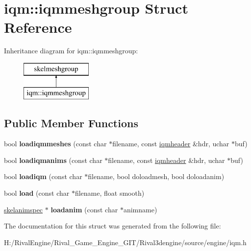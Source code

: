 \hypertarget{structiqm_1_1iqmmeshgroup}{}\section{iqm\+:\+:iqmmeshgroup Struct Reference}
\label{structiqm_1_1iqmmeshgroup}
Inheritance diagram for iqm\+:\+:iqmmeshgroup\+:\begin{figure}[H]
\begin{center}
\leavevmode
\includegraphics[height=2.000000cm]{structiqm_1_1iqmmeshgroup}
\end{center}
\end{figure}
\subsection*{Public Member Functions}
\begin{DoxyCompactItemize}
\item 
\mbox{\label{structiqm_1_1iqmmeshgroup_a4375ead72ec9379faa531c8a31ec9b30}} 
bool {\bfseries loadiqmmeshes} (const char $\ast$filename, const \hyperlink{structiqmheader}{iqmheader} \&hdr, uchar $\ast$buf)
\item 
\mbox{\label{structiqm_1_1iqmmeshgroup_abcece4550a6d63db718c3cef38a8c5cf}} 
bool {\bfseries loadiqmanims} (const char $\ast$filename, const \hyperlink{structiqmheader}{iqmheader} \&hdr, uchar $\ast$buf)
\item 
\mbox{\label{structiqm_1_1iqmmeshgroup_ae55635395d8c24abcecfbbaf6d457195}} 
bool {\bfseries loadiqm} (const char $\ast$filename, bool doloadmesh, bool doloadanim)
\item 
\mbox{\label{structiqm_1_1iqmmeshgroup_a6d954879b433a26a1fe2a5200392b0c8}} 
bool {\bfseries load} (const char $\ast$filename, float smooth)
\item 
\mbox{\label{structiqm_1_1iqmmeshgroup_a165d0faadc64faeb6d41889685698222}} 
\hyperlink{structskelmodel_1_1skelanimspec}{skelanimspec} $\ast$ {\bfseries loadanim} (const char $\ast$animname)
\end{DoxyCompactItemize}


The documentation for this struct was generated from the following file\+:\begin{DoxyCompactItemize}
\item 
H\+:/\+Rival\+Engine/\+Rival\+\_\+\+Game\+\_\+\+Engine\+\_\+\+G\+I\+T/\+Rival3dengine/source/engine/iqm.\+h\end{DoxyCompactItemize}
